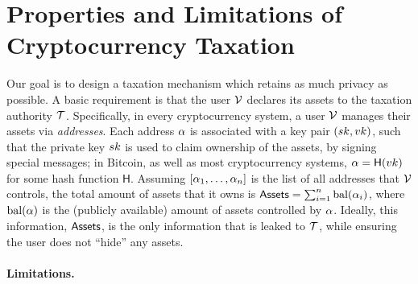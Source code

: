 \section{Properties and Limitations of Cryptocurrency Taxation}\label{sec:taxation}

Our goal is to design a taxation mechanism which retains as much privacy as
possible. A basic requirement is that the user $\mathcal{V}$ declares its assets to
the taxation authority $\mathcal{T}$.  Specifically, in every cryptocurrency
system, a user $\mathcal{V}$ manages their assets via \emph{addresses}. Each address
$\alpha$ is associated with a key pair $(sk, vk)$, such that the private key
$sk$ is used to claim ownership of the assets, \eg by signing special
messages; in Bitcoin, as well as most cryptocurrency systems, $\alpha =
\mathsf{H}(vk)$ for some hash function $\mathsf{H}$. Assuming
$[\alpha_1, \dots, \alpha_n]$ is the list of all addresses that $\mathcal{V}$
controls, the total amount of assets that it owns is $\mathsf{Assets} = \sum_{i=1}^n
\text{bal}(\alpha_i)$, where $\text{bal}(\alpha)$ is the (publicly available)
amount of assets controlled by $\alpha$.  Ideally, this information, \ie
$\mathsf{Assets}$, is the only information that is leaked to $\mathcal{T}$, while ensuring
the user does not ``hide'' any assets.

\paragraph{Limitations.}\label{subsec:limitations}

